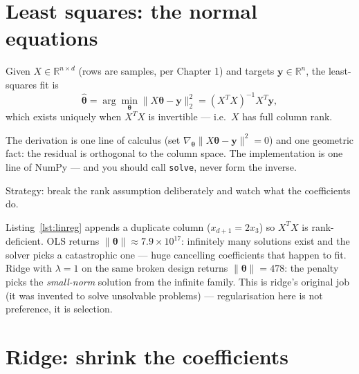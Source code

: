 \section{Least squares: the normal equations}\label{sec:ols}

\begin{definition}
Given $X \in \mathbb{R}^{n\times d}$ (rows are samples, per Chapter 1) and
targets $\mathbf{y} \in \mathbb{R}^n$, the least-squares fit is
\[
\hat{\boldsymbol\theta} = \arg\min_{\boldsymbol\theta}
\|X\boldsymbol\theta - \mathbf{y}\|_2^2
= (X^TX)^{-1}X^T\mathbf{y},
\]
which exists uniquely when $X^TX$ is invertible --- i.e.\ $X$ has full
column rank.
\end{definition}

The derivation is one line of calculus (set $\nabla_{\boldsymbol\theta}
\|X\boldsymbol\theta - \mathbf{y}\|^2 = 0$) and one geometric fact: the
residual is orthogonal to the column space. The implementation is one line
of NumPy --- and you should call \texttt{solve}, never form the inverse.





\begin{example}\label{ex:singular}
Strategy: break the rank assumption deliberately and watch what the
coefficients do.\par
\begin{solution}
Listing~\ref{lst:linreg} appends a duplicate column ($x_{d+1} = 2x_3$) so
$X^TX$ is rank-deficient. OLS returns $\|\boldsymbol\theta\| \approx
7.9\times10^{17}$: infinitely many solutions exist and the solver picks a
catastrophic one --- huge cancelling coefficients that happen to fit.
Ridge with $\lambda{=}1$ on the same broken design returns
$\|\boldsymbol\theta\| = 478$: the penalty picks the \emph{small-norm}
solution from the infinite family. This is ridge's original job (it was
invented to solve unsolvable problems) --- regularisation here is not
preference, it is selection.
\end{solution}
\end{example}

\section{Ridge: shrink the coefficients}\label{sec:ridge}

